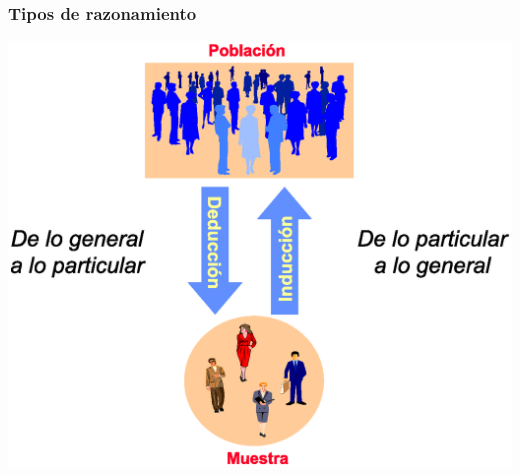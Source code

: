 \begin{frame}
\frametitle{Tipos de razonamiento}

\begin{center}
\includegraphics[scale=0.5]{img/introduccion/tipos_razonamiento}
\end{center}
\end{frame}
